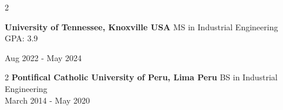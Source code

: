 \documentclass[10pt, letterpaper]{article}
\newenvironment{twocolentry}[2][]{
    \onecolentry
    \def\secondColumn{#2}
    \setcolumnwidth{\fill, 4.5 cm}
    \begin{paracol}{2}
}{
    \switchcolumn \raggedleft \secondColumn
    \end{paracol}
    \endonecolentry
} %
\begin{document}
\begin{twocolentry}{Aug 2022 - May 2024}
    \small \textbf{University of Tennessee, Knoxville USA} \textbar MS in Industrial Engineering\\
    GPA: 3.9
\end{twocolentry}

\begin{twocolentry}{March 2014 - May 2020} %
    \small \textbf{Pontifical Catholic University of Peru, Lima Peru} \textbar BS in Industrial Engineering\\
\end{twocolentry}



\end{document}
